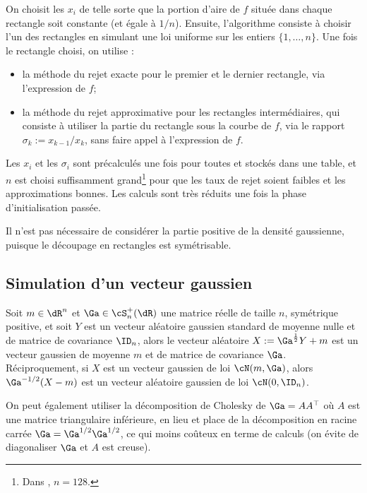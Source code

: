 On choisit les $x_i$ de telle sorte que la portion d'aire de $f$ située dans
chaque rectangle soit constante (et égale à $1/n$). Ensuite, l'algorithme
consiste à choisir l'un des rectangles en simulant une loi uniforme sur les
entiers $\{1,\ldots,n\}$. Une fois le rectangle choisi, on utilise :
\begin{itemize}
\item la méthode du rejet exacte pour le premier et le dernier
  rectangle, via l'expression de $f$;
\item la méthode du rejet approximative pour les rectangles
  intermédiaires, qui consiste à utiliser la partie du rectangle sous
  la courbe de $f$, via le rapport $\sigma_k:=x_{k-1}/x_k$, sans faire
  appel à l'expression de $f$.
\end{itemize}
Les $x_i$ et les $\sigma_i$ sont précalculés une fois pour toutes et stockés dans
une table, et $n$ est choisi suffisamment grand\footnote{Dans \ML{}, $n=128$.}
pour que les taux de rejet soient faibles et les approximations bonnes.  Les
calculs sont très réduits une fois la phase d'initialisation passée.

Il n'est pas nécessaire de considérer la partie positive de la densité
gaussienne, puisque le découpage en rectangles est symétrisable.

%
\subsection{Simulation d'un vecteur gaussien}\label{se:simvg}
%


Soit $m\in\dR^n$ et $\Ga\in\cS_n^+(\dR)$ une matrice réelle de taille $n$,
symétrique positive, et soit $Y$ est un vecteur aléatoire gaussien standard de
moyenne nulle et de matrice de covariance $\ID_n$, alors le vecteur aléatoire
$X:=\Ga^{\frac{1}{2}} Y + m$ est un vecteur gaussien de moyenne $m$ et de
matrice de covariance $\Ga$. Réciproquement, si $X$ est un vecteur gaussien de
loi $\cN(m,\Ga)$, alors $\Ga^{-1/2}(X-m)$ est un vecteur aléatoire gaussien de
loi $\cN(0,\ID_n)$.

On peut également utiliser la décomposition de Cholesky de $\Ga=AA^\top$ où
$A$ est une matrice triangulaire inférieure, en lieu et place de la
décomposition en racine carrée $\Ga=\Ga^{1/2}\Ga^{1/2}$, ce qui moins coûteux
en terme de calculs (on évite de diagonaliser $\Ga$ et $A$ est creuse).

